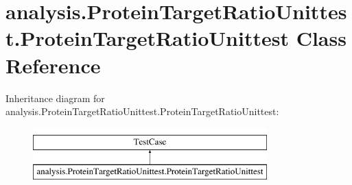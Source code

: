 \hypertarget{classanalysis_1_1ProteinTargetRatioUnittest_1_1ProteinTargetRatioUnittest}{\section{analysis.\-Protein\-Target\-Ratio\-Unittest.\-Protein\-Target\-Ratio\-Unittest Class Reference}
\label{classanalysis_1_1ProteinTargetRatioUnittest_1_1ProteinTargetRatioUnittest}
}
Inheritance diagram for analysis.\-Protein\-Target\-Ratio\-Unittest.\-Protein\-Target\-Ratio\-Unittest\-:\begin{figure}[H]
\begin{center}
\leavevmode
\includegraphics[height=2.000000cm]{classanalysis_1_1ProteinTargetRatioUnittest_1_1ProteinTargetRatioUnittest}
\end{center}
\end{figure}
